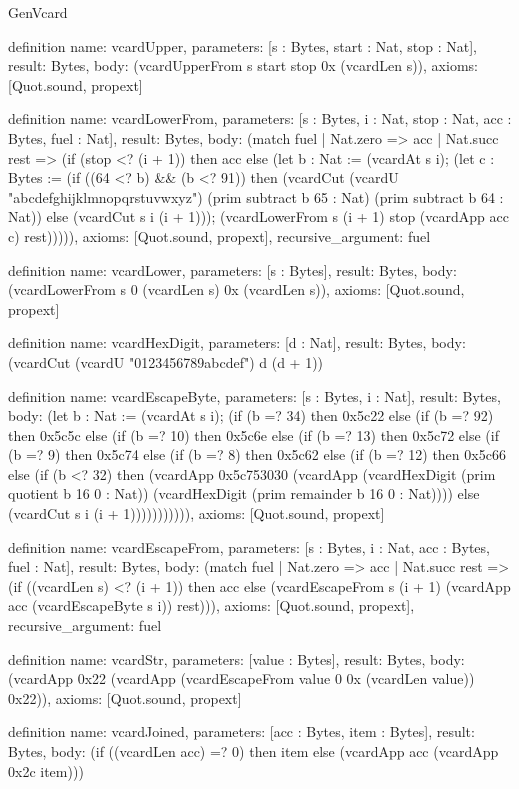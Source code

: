\begin{lexlean}{GenVcard}
\begin{semanticmodule}
definition{
  name: vcardUpper,
  parameters: [s : Bytes, start : Nat, stop : Nat],
  result: Bytes,
  body: (vcardUpperFrom s start stop 0x (vcardLen s)),
  axioms: [Quot.sound, propext]
}

definition{
  name: vcardLowerFrom,
  parameters: [s : Bytes, i : Nat, stop : Nat, acc : Bytes, fuel : Nat],
  result: Bytes,
  body: (match fuel
    | Nat.zero => acc
    | Nat.succ rest => (if (stop <? (i + 1)) then acc else (let b : Nat := (vcardAt s i); (let c : Bytes := (if ((64 <? b) && (b <? 91)) then (vcardCut (vcardU "abcdefghijklmnopqrstuvwxyz") (prim subtract b 65 : Nat) (prim subtract b 64 : Nat)) else (vcardCut s i (i + 1))); (vcardLowerFrom s (i + 1) stop (vcardApp acc c) rest))))),
  axioms: [Quot.sound, propext],
  recursive_argument: fuel
}

definition{
  name: vcardLower,
  parameters: [s : Bytes],
  result: Bytes,
  body: (vcardLowerFrom s 0 (vcardLen s) 0x (vcardLen s)),
  axioms: [Quot.sound, propext]
}

definition{
  name: vcardHexDigit,
  parameters: [d : Nat],
  result: Bytes,
  body: (vcardCut (vcardU "0123456789abcdef") d (d + 1))
}

definition{
  name: vcardEscapeByte,
  parameters: [s : Bytes, i : Nat],
  result: Bytes,
  body: (let b : Nat := (vcardAt s i); (if (b =? 34) then 0x5c22 else (if (b =? 92) then 0x5c5c else (if (b =? 10) then 0x5c6e else (if (b =? 13) then 0x5c72 else (if (b =? 9) then 0x5c74 else (if (b =? 8) then 0x5c62 else (if (b =? 12) then 0x5c66 else (if (b <? 32) then (vcardApp 0x5c753030 (vcardApp (vcardHexDigit (prim quotient b 16 0 : Nat)) (vcardHexDigit (prim remainder b 16 0 : Nat)))) else (vcardCut s i (i + 1))))))))))),
  axioms: [Quot.sound, propext]
}

definition{
  name: vcardEscapeFrom,
  parameters: [s : Bytes, i : Nat, acc : Bytes, fuel : Nat],
  result: Bytes,
  body: (match fuel
    | Nat.zero => acc
    | Nat.succ rest => (if ((vcardLen s) <? (i + 1)) then acc else (vcardEscapeFrom s (i + 1) (vcardApp acc (vcardEscapeByte s i)) rest))),
  axioms: [Quot.sound, propext],
  recursive_argument: fuel
}

definition{
  name: vcardStr,
  parameters: [value : Bytes],
  result: Bytes,
  body: (vcardApp 0x22 (vcardApp (vcardEscapeFrom value 0 0x (vcardLen value)) 0x22)),
  axioms: [Quot.sound, propext]
}

definition{
  name: vcardJoined,
  parameters: [acc : Bytes, item : Bytes],
  result: Bytes,
  body: (if ((vcardLen acc) =? 0) then item else (vcardApp acc (vcardApp 0x2c item)))
}


\end{semanticmodule}
\end{lexlean}
